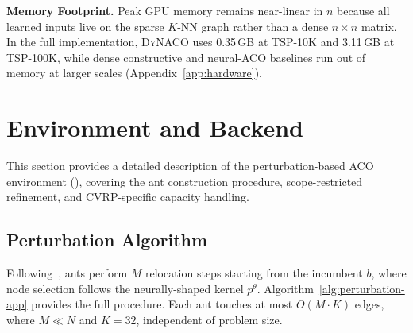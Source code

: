 \documentclass[sigconf]{acmart}
\newcommand{\DyNACO}{\textsc{DyNACO}}
\begin{document}
\textbf{Memory Footprint.}
Peak GPU memory remains near-linear in $n$ because all learned inputs live on the sparse $K$-NN graph rather than a dense $n \times n$ matrix.
In the full implementation, \DyNACO{} uses 0.35\,GB at TSP-10K and 3.11\,GB at TSP-100K, while dense constructive and neural-ACO baselines run out of memory at larger scales (Appendix~\ref{app:hardware}).


\section{Environment and Backend}
\label{app:backend}

This section provides a detailed description of the perturbation-based ACO environment (), covering the ant construction procedure, scope-restricted refinement, and CVRP-specific capacity handling.

\subsection{Perturbation Algorithm}
\label{app:perturbation}

Following~\cite{faco}, ants perform $M$ relocation steps starting from the incumbent $b$, where node selection follows the neurally-shaped kernel $p^\theta$.
Algorithm~\ref{alg:perturbation-app} provides the full procedure.
Each ant touches at most $O(M \cdot K)$ edges, where $M \ll N$ and $K{=}32$, independent of problem size.
\end{document}
